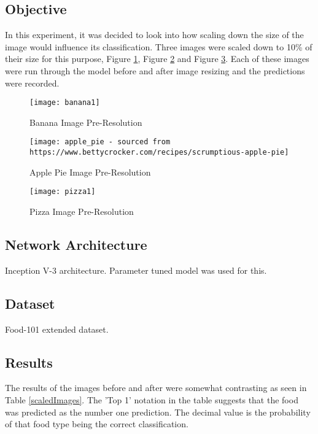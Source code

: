 \subsection*{Objective}
In this experiment, it was decided to look into how scaling down the size of the image would influence its classification. Three images were scaled down to 10\% of their size for this purpose, Figure \ref{fig:bananaPreRes}, Figure \ref{fig:apple_piePreRes} and Figure \ref{fig:pizzaPreRes}. Each of these images were run through the model before and after image resizing and the predictions were recorded.

\begin{figure}
	\centering
    \texttt{[image: banana1]}
    \caption{Banana Image Pre-Resolution}
    \label{fig:bananaPreRes}
\end{figure}

\begin{figure}
	\centering
    \texttt{[image: apple\_pie - sourced from https://www.bettycrocker.com/recipes/scrumptious-apple-pie]}
    \caption{Apple Pie Image Pre-Resolution}
    \label{fig:apple_piePreRes}
\end{figure}

\begin{figure}	
	\centering
    \texttt{[image: pizza1]}
    \caption{Pizza Image Pre-Resolution}
    \label{fig:pizzaPreRes}
\end{figure}

\subsection*{Network Architecture}
Inception V-3 architecture. Parameter tuned model was used for this.

\subsection*{Dataset}
Food-101 extended dataset.

\subsection*{Results}
The results of the images before and after were somewhat contrasting as seen in Table \ref{scaledImages}.
The 'Top 1' notation in the table suggests that the food was predicted as the number one prediction. The decimal value is the probability of that food type being the correct classification.

